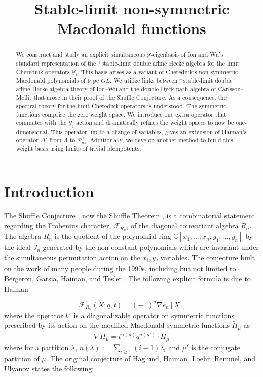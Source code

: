 \documentclass[ALCO,Unicode]{cedram}
\title{Stable-limit non-symmetric Macdonald functions}
\author[\initial{M.} \middlename{J.} Bechtloff Weising]{\firstname{Milo} \middlename{J.} \lastname{Bechtloff Weising}}
\begin{document}
\begin{abstract}
  We construct and study an explicit simultaneous $\mathscr{Y}$-eigenbasis of Ion and Wu's standard representation of the $^+$stable-limit double affine Hecke algebra for the limit Cherednik operators $\mathscr{Y}_i$. This basis arises as a variant of Cherednik's non-symmetric Macdonald polynomials of type $GL$. We utilize links between $^+$stable-limit double affine Hecke algebra theory of Ion--Wu and the double Dyck path algebra of Carlsson--Mellit that arose in their proof of the Shuffle Conjecture. As a consequence, the spectral theory for the limit Cherednik operators is understood. The symmetric functions comprise the zero weight space. We introduce one extra operator that commutes with the $\mathscr{Y}_i$ action and dramatically refines the weight spaces to now be one-dimensional. This operator, up to a change of variables, gives an extension of Haiman's operator $\Delta'$ from $\Lambda$ to $\mathscr{P}_{as}^{+}.$
Additionally, we develop another method to build this weight basis using limits of trivial idempotents.
\end{abstract}

\maketitle

\section{Introduction}\label{intro section}
The Shuffle Conjecture \cite{HHLRU-2003}, now the Shuffle Theorem \cite{CM_2015}, is a combinatorial statement regarding the Frobenius character, $\mathcal{F}_{R_n}$, of the diagonal coinvariant algebra $R_n.$ The algebra $R_n$ is the quotient of the polynomial ring $\mathbb{C}[x_1,\ldots,x_n,y_1,\ldots,y_n]$ by the ideal $J_n$ generated by the non-constant polynomials which are invariant under the simultaneous permutation action on the $x_i,y_j$ variables.
The conjecture built on the work of many people during the 1990s, including but not limited to Bergeron, Garsia, Haiman,  and Tesler \cite{BGSciFi, GHCat, BGHT}.
The following explicit formula is due to Haiman \cite{HVanish}

    $$ \mathcal{F}_{R_n}(X;q,t) = (-1)^n \nabla e_n[X] $$
    where the operator $\nabla$ is a diagonalizable operator on symmetric functions prescribed by its action on the modified Macdonald symmetric functions  $\widetilde{H}_{\mu}$  as
    $$\nabla \widetilde{H}_{\mu} = t^{n(\mu)} q^{n(\mu')}\cdot  \widetilde{H}_{\mu} $$ where for a partition $\lambda$, $n(\lambda):= \sum_{i \geq 1}(i-1)\lambda_i$ and $\mu'$ is the conjugate partition of $\mu.$
    The original conjecture of Haglund, Haiman, Loehr, Remmel, and Ulyanov \cite{HHLRU-2003} states the following:
        
\end{document}
